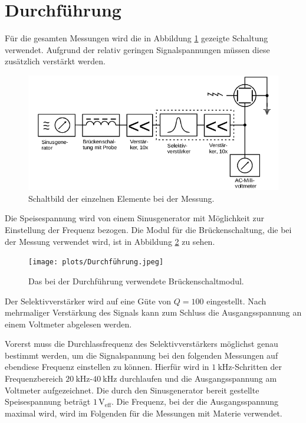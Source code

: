 \section{Durchführung}
\label{sec:Durchführung}

Für die gesamten Messungen wird die in Abbildung \ref{fig:Durchfuehrung} gezeigte Schaltung verwendet. 
Aufgrund der relativ geringen Signalspannungen müssen diese zusätzlich verstärkt werden. 
\begin{figure}
    \centering
    \includegraphics[width=\textwidth]{plots/FinalResult.png}
    \caption{Schaltbild der einzelnen Elemente bei der Messung\cite{Versuchsanleitung}.}
    \label{fig:Durchfuehrung}
\end{figure}
Die Speisespannung wird von einem Sinusgenerator mit Möglichkeit zur Einstellung der Frequenz bezogen. 
Die Modul für die Brückenschaltung, die bei der Messung verwendet wird, ist in Abbildung \ref{fig:Bruecke} zu sehen.
\begin{figure}
    \centering
    \texttt{[image: plots/Durchführung.jpeg]}
    \caption{Das bei der Durchführung verwendete Brückenschaltmodul.}
    \label{fig:Bruecke}
\end{figure}
Der Selektivverstärker wird auf eine Güte von $Q=100$ eingestellt.
Nach mehrmaliger Verstärkung des Signals kann zum Schluss die Ausgangsspannung an einem Voltmeter abgelesen werden. 

Vorerst muss die Durchlassfrequenz des Selektivverstärkers möglichst genau bestimmt werden, um die Signalspannung 
bei den folgenden Messungen auf ebendiese Frequenz einstellen zu können.
Hierfür wird in $\SI{1}{\kilo\hertz}$-Schritten der Frequenzbereich $\SI{20}{\kilo\hertz}$-$\SI{40}{\kilo\hertz}$ durchlaufen
und die Ausgangsspannung am Voltmeter aufgezeichnet.
Die durch den Sinusgenerator bereit gestellte Speisespannung beträgt $1\,\mathrm{V}_\text{eff}$.
Die Frequenz, bei der die Ausgangsspannung maximal wird, wird im Folgenden für die Messungen mit Materie verwendet. 

